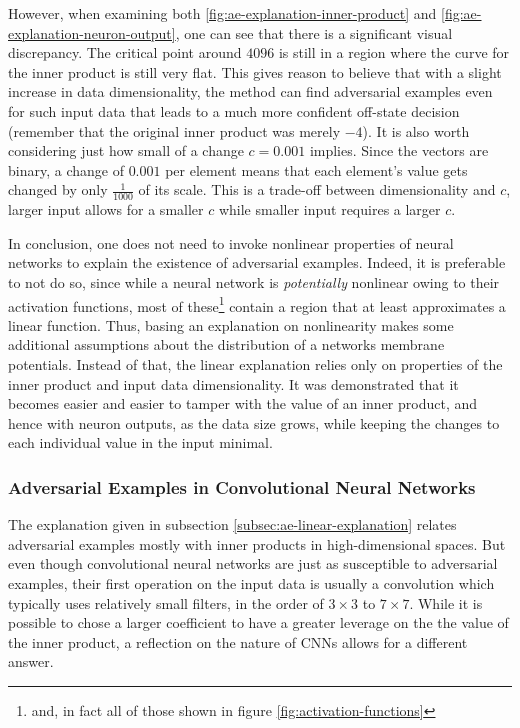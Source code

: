 \documentclass[11pt, a4paper]{article}
\begin{document}
However, when examining both \ref{fig:ae-explanation-inner-product} and \ref{fig:ae-explanation-neuron-output}, one can see that there is a significant visual discrepancy. The critical point around $4096$ is still in a region where the curve for the inner product is still very flat. This gives reason to believe that with a slight increase in data dimensionality, the method can find adversarial examples even for such input data that leads to a much more confident off-state decision (remember that the original inner product was merely $-4$). It is also worth considering just how small of a change $c = 0.001$ implies. Since the vectors are binary, a change of $0.001$ per element means that each element's value gets changed by only $\frac{1}{1000}$ of its scale. This is a trade-off between dimensionality and $c$, larger input allows for a smaller $c$ while smaller input requires a larger $c$.

In conclusion, one does not need to invoke nonlinear properties of neural networks to explain the existence of adversarial examples. Indeed, it is preferable to not do so, since while a neural network is \emph{potentially} nonlinear owing to their activation functions, most of these\footnote{and, in fact all of those shown in figure \ref{fig:activation-functions}} contain a region that at least approximates a linear function. Thus, basing an explanation on nonlinearity makes some additional assumptions about the distribution of a networks membrane potentials. Instead of that, the linear explanation relies only on properties of the inner product and input data dimensionality. It was demonstrated that it becomes easier and easier to tamper with the value of an inner product, and hence with neuron outputs, as the data size grows, while keeping the changes to each individual value in the input minimal.

\subsubsection{Adversarial Examples in Convolutional Neural Networks}
The explanation given in subsection \ref{subsec:ae-linear-explanation} relates adversarial examples mostly with inner products in high-dimensional spaces. But even though convolutional neural networks are just as susceptible to adversarial examples, their first operation on the input data is usually a convolution which typically uses relatively small filters, in the order of $3 \times 3$ to $7 \times 7$. While it is possible to chose a larger coefficient to have a greater leverage on the the value of the inner product, a reflection on the nature of CNNs allows for a different answer.
\end{document}
